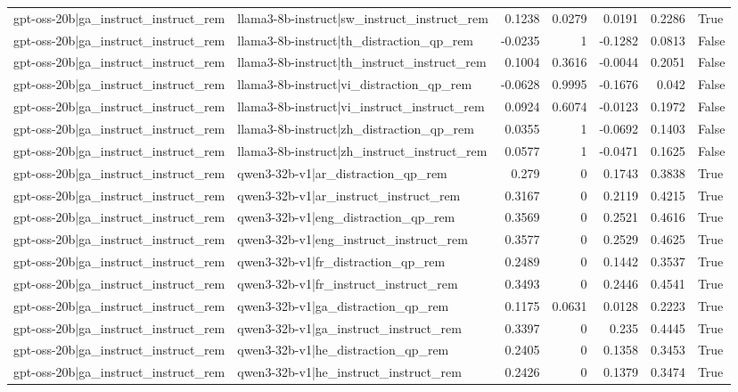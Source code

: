 \begin{table}
\begin{tabular}{l l r r r r l}
gpt-oss-20b|ga_instruct_instruct_rem & llama3-8b-instruct|sw_instruct_instruct_rem & 0.1238 & 0.0279 & 0.0191 & 0.2286 & True \\
gpt-oss-20b|ga_instruct_instruct_rem & llama3-8b-instruct|th_distraction_qp_rem & -0.0235 & 1 & -0.1282 & 0.0813 & False \\
gpt-oss-20b|ga_instruct_instruct_rem & llama3-8b-instruct|th_instruct_instruct_rem & 0.1004 & 0.3616 & -0.0044 & 0.2051 & False \\
gpt-oss-20b|ga_instruct_instruct_rem & llama3-8b-instruct|vi_distraction_qp_rem & -0.0628 & 0.9995 & -0.1676 & 0.042 & False \\
gpt-oss-20b|ga_instruct_instruct_rem & llama3-8b-instruct|vi_instruct_instruct_rem & 0.0924 & 0.6074 & -0.0123 & 0.1972 & False \\
gpt-oss-20b|ga_instruct_instruct_rem & llama3-8b-instruct|zh_distraction_qp_rem & 0.0355 & 1 & -0.0692 & 0.1403 & False \\
gpt-oss-20b|ga_instruct_instruct_rem & llama3-8b-instruct|zh_instruct_instruct_rem & 0.0577 & 1 & -0.0471 & 0.1625 & False \\
gpt-oss-20b|ga_instruct_instruct_rem & qwen3-32b-v1|ar_distraction_qp_rem & 0.279 & 0 & 0.1743 & 0.3838 & True \\
gpt-oss-20b|ga_instruct_instruct_rem & qwen3-32b-v1|ar_instruct_instruct_rem & 0.3167 & 0 & 0.2119 & 0.4215 & True \\
gpt-oss-20b|ga_instruct_instruct_rem & qwen3-32b-v1|eng_distraction_qp_rem & 0.3569 & 0 & 0.2521 & 0.4616 & True \\
gpt-oss-20b|ga_instruct_instruct_rem & qwen3-32b-v1|eng_instruct_instruct_rem & 0.3577 & 0 & 0.2529 & 0.4625 & True \\
gpt-oss-20b|ga_instruct_instruct_rem & qwen3-32b-v1|fr_distraction_qp_rem & 0.2489 & 0 & 0.1442 & 0.3537 & True \\
gpt-oss-20b|ga_instruct_instruct_rem & qwen3-32b-v1|fr_instruct_instruct_rem & 0.3493 & 0 & 0.2446 & 0.4541 & True \\
gpt-oss-20b|ga_instruct_instruct_rem & qwen3-32b-v1|ga_distraction_qp_rem & 0.1175 & 0.0631 & 0.0128 & 0.2223 & True \\
gpt-oss-20b|ga_instruct_instruct_rem & qwen3-32b-v1|ga_instruct_instruct_rem & 0.3397 & 0 & 0.235 & 0.4445 & True \\
gpt-oss-20b|ga_instruct_instruct_rem & qwen3-32b-v1|he_distraction_qp_rem & 0.2405 & 0 & 0.1358 & 0.3453 & True \\
gpt-oss-20b|ga_instruct_instruct_rem & qwen3-32b-v1|he_instruct_instruct_rem & 0.2426 & 0 & 0.1379 & 0.3474 & True \\

\end{tabular}
\end{table}
